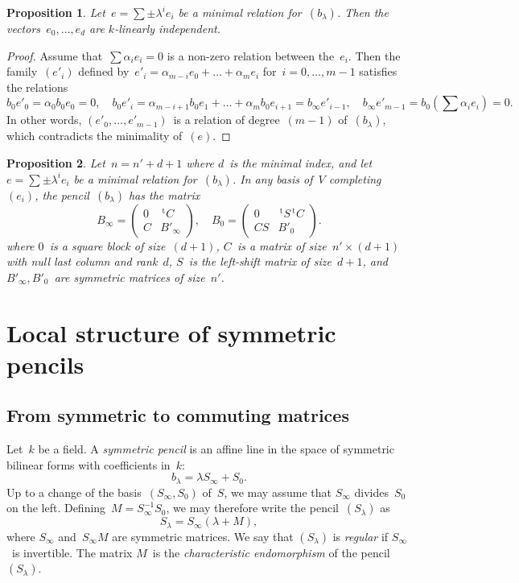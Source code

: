 \documentclass{article}%
\newtheorem{prop}{Proposition}
\def\transpose{\,{}^{\mathrm{t}\!}}
\def\mat#1{\begin{pmatrix}#1\end{pmatrix}}
\begin{document}
\begin{prop}\label{prop:minimal-indep}
Let~$e = ∑ ± λ^i e_i$ be a minimal relation for~$(b_{λ})$. Then the
vectors~$e_0,…,e_{d}$ are $k$-linearly independent.
\end{prop}

\begin{proof}
Assume that~$∑ α_i e_i = 0$ is a non-zero relation between the~$e_i$.
Then the family~$(e'_i)$ defined by~$e'_i = α_{m-i} e_0 + … + α_m
e_{i}$ for~$i = 0, …, m-1$ satisfies the relations
\begin{equation}\label{eq:relation-e'}
b_0 e'_0 = α_0 b_0 e_0 = 0, \quad
b_0 e'_{i} = α_{m-i+1} b_0 e_1 + … + α_{m} b_0 e_{i+1} = b_{∞} e'_{i-1}, \quad
b_{∞} e'_{m-1} = b_0(∑ α_i e_i) = 0.
\end{equation}
In other words, $(e'_0,…, e'_{m-1})$~is a relation of degree~$(m-1)$
of~$(b_{λ})$, which contradicts the minimality of~$(e)$.
\end{proof}


\begin{prop}\label{prop:minimal-matrix}
Let~$n = n'+d+1$ where $d$~is the minimal index, and let~$e = ∑ ± λ^i
e_i$ be a minimal relation for~$(b_{λ})$. In any basis of~$V$
completing~$(e_i)$, the pencil~$(b_{λ})$ has the matrix
\begin{equation}
B_{∞} = \mat{0 & \transpose{C}\\ C & B'_{∞}}, \quad
B_{0} = \mat{0 & \transpose{S} \transpose{C}\\ CS & B'_{0}}.
\end{equation}
where $0$~is a square block of size~$(d+1)$, $C$~is a matrix of size~$n'
× (d+1)$ with null last column and rank~$d$, $S$~is the left-shift
matrix of size~$d+1$, and $B'_{∞}, B'_0$~are symmetric matrices of
size~$n'$.
\end{prop}


\section{Local structure of symmetric pencils}%
\subsection{From symmetric to commuting matrices}%

Let~$k$ be a field. A \emph{symmetric pencil} is an affine line in the
space of symmetric bilinear forms with coefficients in~$k$:
\begin{equation}
b_{λ} = λ S_{∞} + S_0.
\end{equation}
Up to a change of the basis~$(S_{∞}, S_{0})$ of~$S$, we may assume that
$S_{∞}$ divides~$S_0$ on the left. Defining~$M = S_{∞}^{-1} S_0^{}$, we
may therefore write the pencil~$(S_{λ})$ as
\begin{equation}
S_{λ} = S_{∞} (λ + M),
\end{equation}
where $S_{∞}$ and~$S_{∞} M$ are symmetric matrices. We say that $(S_{λ})$
is \emph{regular} if $S_{∞}$~is invertible. The matrix $M$~is the
\emph{characteristic endomorphism} of the pencil~$(S_{λ})$.
\end{document}
